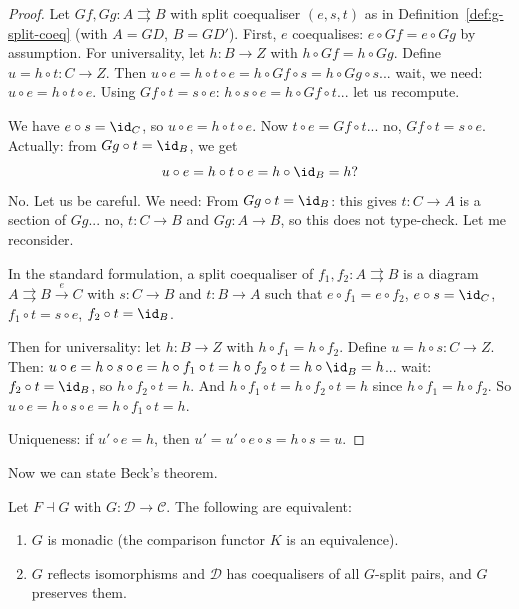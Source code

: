 \begin{proof}
Let $Gf,Gg\colon A\rightrightarrows B$ with split coequaliser $(e,s,t)$
as in Definition~\ref{def:g-split-coeq} (with $A=GD$, $B=GD'$).
First, $e$ coequalises: $e\circ Gf = e\circ Gg$ by assumption.
For universality, let $h\colon B\to Z$ with $h\circ Gf = h\circ Gg$.
Define $u = h\circ t\colon C\to Z$.  Then
$u\circ e = h\circ t\circ e = h\circ Gf\circ s = h\circ Gg\circ s$...
wait, we need: $u\circ e = h\circ t\circ e$.  Using $Gf\circ t = s\circ e$:
$h\circ s\circ e = h\circ Gf\circ t$... let us recompute.

We have $e\circ s = \id_C$, so $u\circ e = h\circ t\circ e$.
Now $t\circ e = Gf\circ t$... no, $Gf\circ t = s\circ e$.
Actually: from $Gg\circ t = \id_B$, we get
\[
    u\circ e = h\circ t\circ e = h\circ\id_B = h?
\]
No. Let us be careful.  We need:
From $Gg\circ t = \id_B$: this gives $t\colon C\to A$ is a section of
$Gg$... no, $t\colon C\to B$ and $Gg\colon A\to B$, so this does
not type-check.  Let me reconsider.

In the standard formulation, a split coequaliser of $f_1,f_2\colon A\rightrightarrows B$
is a diagram $A\rightrightarrows B\xrightarrow{e} C$ with
$s\colon C\to B$ and $t\colon B\to A$ such that
$e\circ f_1 = e\circ f_2$, $e\circ s = \id_C$,
$f_1\circ t = s\circ e$, $f_2\circ t = \id_B$.

Then for universality: let $h\colon B\to Z$ with $h\circ f_1 = h\circ f_2$.
Define $u = h\circ s\colon C\to Z$.  Then:
$u\circ e = h\circ s\circ e = h\circ f_1\circ t = h\circ f_2\circ t
= h\circ\id_B^{} = h$... wait: $f_2\circ t = \id_B$, so
$h\circ f_2\circ t = h$.  And $h\circ f_1\circ t = h\circ f_2\circ t = h$
since $h\circ f_1 = h\circ f_2$.  So $u\circ e = h\circ s\circ e
= h\circ f_1\circ t = h$.

Uniqueness: if $u'\circ e = h$, then $u' = u'\circ e\circ s = h\circ s = u$.
\end{proof}

Now we can state Beck's theorem.

\begin{theorem}\label{thm:beck}
Let $F\dashv G$ with $G\colon\mathcal{D}\to\mathcal{C}$.
The following are equivalent:
\begin{enumerate}[label=(\roman*)]
\item $G$ is monadic (the comparison functor $K$ is an equivalence).
\item $G$ reflects isomorphisms and $\mathcal{D}$ has coequalisers of
    all $G$-split pairs, and $G$ preserves them.
\end{enumerate}
\end{theorem}

